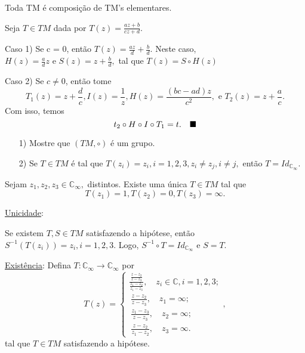 \documentclass[complex.tex]{subfiles}
\begin{document}
\begin{prop*}
	Toda TM é composição de TM's elementares.
\end{prop*}
\begin{proof*}
	Seja $T\in{TM}$ dada por $T(z) = \displaystyle\frac{az + b}{cz + d}.$

	Caso 1) Se c = 0, então $T(z) = \frac{az}{d} + \frac{b}{d}.$ Neste caso, $H(z) = \frac{a}{d}z \text{ e } S(z) = z + \frac{b}{d},$
	tal que $T(z) = S\circ{H(z)}$

	Caso 2) Se $c\neq0$, então tome
	$$
		T_1(z) = z + \frac{d}{c}, I(z) = \frac{1}{z}, H(z) = \frac{(bc - ad)z}{c^2}, \text{ e } T_2(z) = z + \frac{a}{c}.
	$$
	Com isso, temos
	$$
		t_2\circ{H}\circ{I}\circ{T_1} = t. \quad \text{$\blacksquare$}
	$$
\end{proof*}
\begin{exer*}
	\begin{itemize}
		\item[1)]Mostre que $(TM, \circ)$ é um grupo.
		\item[2)] Se $T\in{TM}$ é tal que $T(z_{i}) = z_{i}, i = 1, 2, 3, z_{i}\neq z_{j}, i\neq{j},$ então $T = Id_{\mathbb{C}_{\infty}}.$
	\end{itemize}
\end{exer*}
\begin{prop*}
	Sejam $z_1, z_2, z_3\in \mathbb{C}_{\infty}, $ distintos. Existe uma única $T\in{TM}$ tal que
	$$
		T(z_1) = 1, T(z_2) = 0, T(z_3) = \infty.
	$$
\end{prop*}
\begin{proof*}
	\underline{Unicidade}:

	Se existem $T, S\in{TM}$ satisfazendo a hipótese, então $S^{-1}(T(z_i)) = z_{i}, i=1, 2, 3$. Logo,
	$S^{-1}\circ{T} = Id_{\mathbb{C}_{\infty}} \text{ e } S = T.$

	\underline{Existência}: Defina $T:\mathbb{C}_{\infty}\rightarrow \mathbb{C}_{\infty}$ por
	$$
		T(z) = \left\{\begin{array}{ll}
			\displaystyle\frac{\frac{z-z_2}{z-z_3}}{\frac{z_1-z_2}{z_1-z_3}}, \quad z_{i}\in \mathbb{C}, i=1, 2, 3; \\\
			\displaystyle\frac{z-z_2}{z-z_3}, \quad z_1 = \infty;                                                   \\\
			\displaystyle\frac{z_1 - z_3}{z - z_3}, \quad z_2 = \infty;                                             \\\
			\displaystyle\frac{z - z_2}{z_1 - z_2}, \quad z_3 = \infty.
		\end{array}\right.,
	$$
	tal que $T\in{TM}$ satisfazendo a hipótese. \qedsymbol
\end{proof*}
\end{document}
